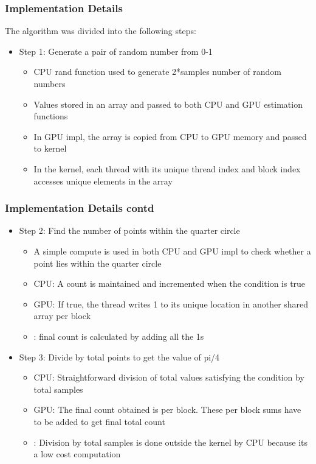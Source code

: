 \documentclass[mathserif]{beamer}
\begin{document}
\begin{frame}                                                                                                                                                                          
\frametitle{Implementation Details}
The algorithm was divided into the following steps:
\begin{itemize}
\item Step 1: Generate a pair of random number from 0-1
\begin{itemize}
\item CPU rand function used to generate 2*samples number of random numbers  
\item Values stored in an array and passed to both CPU and GPU estimation functions
\item In GPU impl, the array is copied from CPU to GPU memory and passed to kernel
\item In the kernel, each thread with its unique thread index and block index accesses unique elements in the array
\end{itemize}
\end{itemize}
\end{frame}              

\begin{frame}                                                                                                                                                                          
\frametitle{Implementation Details contd}
\begin{itemize}
\item Step 2: Find the number of points within the quarter circle
\begin{itemize}
\item A simple compute is used in both CPU and GPU impl to check whether a point lies within the quarter circle 
\item CPU: A count is maintained and incremented when the condition is true
\item GPU: If true, the thread writes 1 to its unique location in another shared array per block
\item    :  final count is calculated by adding all the 1s 
\end{itemize}
\item Step 3: Divide by total points to get the value of pi/4
\begin{itemize}
\item CPU: Straightforward division of total values satisfying the condition by total samples 
\item GPU: The final count obtained is per block. These per block sums have to be added to get final total count 
\item    : Division by total samples is done outside the kernel by CPU because its a low cost computation
\end{itemize}
\end{itemize}
\end{frame}              
 
\end{document}

